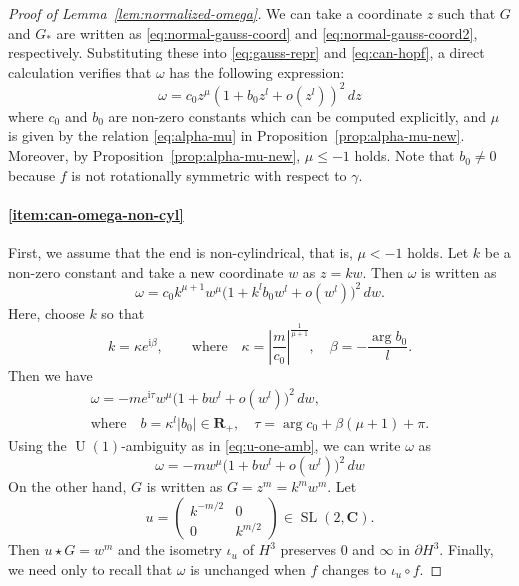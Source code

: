 \documentclass[a4paper]{amsart}
\theoremstyle{plain}
\theoremstyle{remark}
\numberwithin{equation}{section}
\begin{document}
\begin{proof}[Proof of Lemma~\ref{lem:normalized-omega}]
 We can take a coordinate $z$ such that
 $G$ and $G_*$ are written as \eqref{eq:normal-gauss-coord}
 and \eqref{eq:normal-gauss-coord2}, respectively.
 Substituting these into \eqref{eq:gauss-repr} and \eqref{eq:can-hopf},
 a direct calculation verifies that $\omega$ has the following
 expression:
 \begin{equation}\label{eq:omega-first}
   \omega  = c_0 z^{\mu} \left(1+b_0 z^l +o(z^l)\right)^2\,dz
 \end{equation} 
 where $c_0$ and $b_0$ are non-zero constants which can be
 computed explicitly, and 
 $\mu$ is given by the relation \eqref{eq:alpha-mu} in
 Proposition~\ref{prop:alpha-mu-new}.
 Moreover, by Proposition~\ref{prop:alpha-mu-new}, $\mu\leq -1$
 holds.
 Note that $b_0\neq 0$ because $f$ is not rotationally symmetric
 with respect to $\gamma$.

\paragraph{\ref{item:can-omega-non-cyl}}
 First, we assume that the end is non-cylindrical,
 that is, $\mu<-1$ holds.
 Let $k$ be a non-zero constant and take a new coordinate $w$
 as $z=kw$.
 Then $\omega$ is written as
 \[
    \omega = c_0 k^{\mu+1}w^{\mu}
         \bigl(1+k^lb_0w^l+o(w^l)\bigr)^2\,dw.
 \]
 Here, choose $k$ so that
 \[
   k = \kappa e^{{\mathrm{i}} \beta},\qquad\text{where}\quad
    \kappa=\left|\frac{m}{c_0}\right|^{\frac{1}{\mu+1}},\quad
    \beta = -\frac{\arg b_0}{l}.
 \]
 Then we have
 \begin{multline*}\label{eq:omega-pre}
    \omega = -m e^{{\mathrm{i}}\tau}
              w^{\mu}
              \bigl(
                1+b w^l+o(w^l)
              \bigr)^2\,dw,\\
    \text{where}\quad
     b = \kappa^l|b_0|\in{\boldsymbol{R}}_+,\quad
     \tau = \arg c_0+\beta(\mu+1)+\pi.
 \end{multline*}
 Using the ${\operatorname{U}}(1)$-ambiguity as in \eqref{eq:u-one-amb}, we 
 can write $\omega$ as
 \[
    \omega = -m w^{\mu}\bigl(1+b w^l+o(w^l)\bigr)^2 \,dw
 \]
 On the other hand,
 $G$ is written as $G=z^m = k^m w^m$.
 Let
 \begin{equation}\label{eq:u-adjust}
      u = \begin{pmatrix}
	     k^{-m/2} & 0 \\
	     0 & k^{m/2}
	  \end{pmatrix}\in{\operatorname{SL}}(2,{\boldsymbol{C}}).
 \end{equation}
 Then $u\star G = w^m$ and 
 the isometry $\iota_u$ of $H^3$ preserves $0$ and $\infty$
 in $\partial H^3$.
Finally, we need only to recall that $\omega$ 
is unchanged when $f$ changes to $\iota_u \circ f$. 
 

\end{proof}
\end{document}
